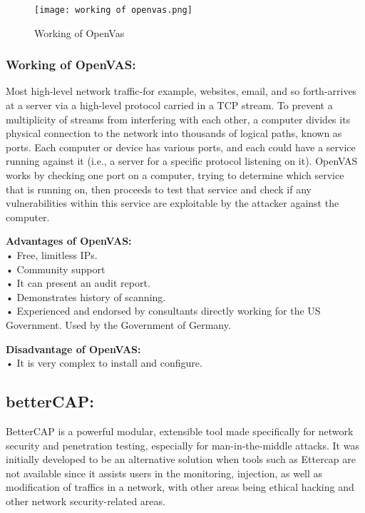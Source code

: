 \documentclass[conference]{IEEEtran}
\begin{document}
\begin{figure}[h]
    \centering
    \texttt{[image: working of openvas.png]}
    \caption{Working of OpenVas}
\end{figure}

\subsubsection{Working of OpenVAS:}
Most high-level network traffic-for example, websites, email, and so forth-arrives at a server via a high-level protocol carried in a TCP stream. To prevent a multiplicity of streams from interfering with each other, a computer divides its physical connection to the network into thousands of logical paths, known as ports. Each computer or device has various ports, and each could have a service running against it (i.e., a server for a specific protocol listening on it). OpenVAS works by checking one port on a computer, trying to determine which service that is running on, then proceeds to test that service and check if any vulnerabilities within this service are exploitable by the attacker against the computer.



\textbf{Advantages of OpenVAS:}
\\• Free, limitless IPs.
\\• Community support
\\• It can present an audit report.
\\• Demonstrates history of scanning.
\\• Experienced and endorsed by consultants directly working for the US Government. Used by the Government of Germany.

\textbf{Disadvantage of OpenVAS:}
\\• It is very complex to install and configure.

\subsection{betterCAP:}
BetterCAP is a powerful modular, extensible tool made specifically for network security and penetration testing, especially for man-in-the-middle attacks. It was initially developed to be an alternative solution when tools such as Ettercap are not available since it assists users in the monitoring, injection, as well as modification of traffics in a network, with other areas being ethical hacking and other network security-related areas.
\end{document}

